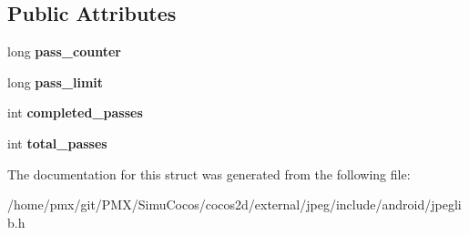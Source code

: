 \subsection*{Public Attributes}
\begin{DoxyCompactItemize}
\item 
\mbox{\label{structjpeg__progress__mgr_ae52d1c89154d3f15ea44f96ee1c4ea7f}} 
long {\bfseries pass\+\_\+counter}
\item 
\mbox{\label{structjpeg__progress__mgr_a68ec6ba74838f7b2b8ded8d4c8254c1d}} 
long {\bfseries pass\+\_\+limit}
\item 
\mbox{\label{structjpeg__progress__mgr_a0cf4c1c84b2662763053e0eeaca417f3}} 
int {\bfseries completed\+\_\+passes}
\item 
\mbox{\label{structjpeg__progress__mgr_a35d61747861f284526a9b312b3dc59ca}} 
int {\bfseries total\+\_\+passes}
\end{DoxyCompactItemize}


The documentation for this struct was generated from the following file\+:\begin{DoxyCompactItemize}
\item 
/home/pmx/git/\+P\+M\+X/\+Simu\+Cocos/cocos2d/external/jpeg/include/android/jpeglib.\+h\end{DoxyCompactItemize}
